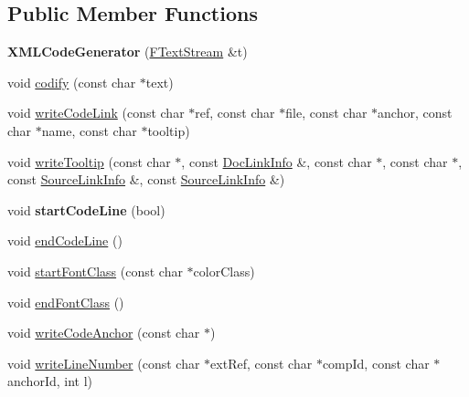 \subsection*{Public Member Functions}
\begin{DoxyCompactItemize}
\item 
\mbox{\label{class_x_m_l_code_generator_a1dd6dbe14d945e6b69470826968cc355}} 
{\bfseries X\+M\+L\+Code\+Generator} (\mbox{\hyperlink{class_f_text_stream}{F\+Text\+Stream}} \&t)
\item 
void \mbox{\hyperlink{class_x_m_l_code_generator_a40ff443bfb15f9f862f8bd3ceb50ce89}{codify}} (const char $\ast$text)
\item 
void \mbox{\hyperlink{class_x_m_l_code_generator_aa0e45ec4ffd221b96f0af9202a098a29}{write\+Code\+Link}} (const char $\ast$ref, const char $\ast$file, const char $\ast$anchor, const char $\ast$name, const char $\ast$tooltip)
\item 
void \mbox{\hyperlink{class_x_m_l_code_generator_afe5258b3e63958ce81ce4895d9ce2334}{write\+Tooltip}} (const char $\ast$, const \mbox{\hyperlink{struct_doc_link_info}{Doc\+Link\+Info}} \&, const char $\ast$, const char $\ast$, const \mbox{\hyperlink{struct_source_link_info}{Source\+Link\+Info}} \&, const \mbox{\hyperlink{struct_source_link_info}{Source\+Link\+Info}} \&)
\item 
\mbox{\label{class_x_m_l_code_generator_a44719eff2d9d919cd24aca0f6313b3ea}} 
void {\bfseries start\+Code\+Line} (bool)
\item 
void \mbox{\hyperlink{class_x_m_l_code_generator_a47927ff273870cc7713f2d20e8c2beb3}{end\+Code\+Line}} ()
\item 
void \mbox{\hyperlink{class_x_m_l_code_generator_aa6d0288952109fba1efe98d82e863b70}{start\+Font\+Class}} (const char $\ast$color\+Class)
\item 
void \mbox{\hyperlink{class_x_m_l_code_generator_adbf57d4544dc1c27571b472f3990a385}{end\+Font\+Class}} ()
\item 
void \mbox{\hyperlink{class_x_m_l_code_generator_a2c6ae0bc633493d36a2b517c44ebb8f4}{write\+Code\+Anchor}} (const char $\ast$)
\item 
void \mbox{\hyperlink{class_x_m_l_code_generator_af06c584af323f840eb54a2ab98acd8c2}{write\+Line\+Number}} (const char $\ast$ext\+Ref, const char $\ast$comp\+Id, const char $\ast$anchor\+Id, int l)
\item 

\end{DoxyCompactItemize}

